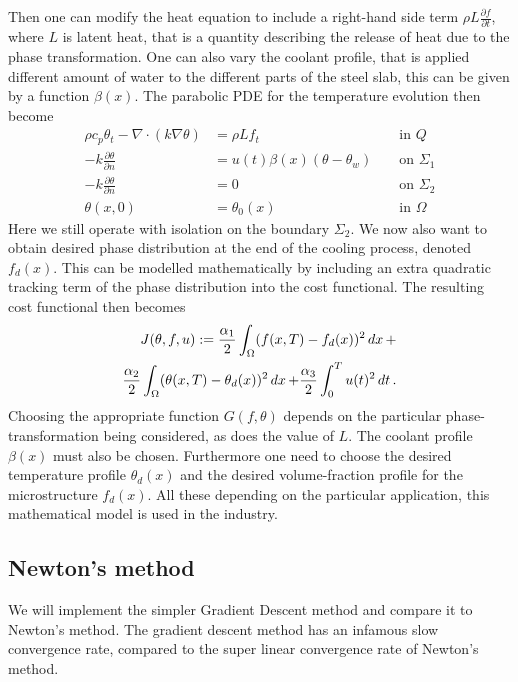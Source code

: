 Then one can modify the heat equation to include a right-hand side term $\rho L \frac{\partial f}{\partial t}$, where $L$ is latent heat, that is a quantity describing the release of heat due to the phase transformation. One can also vary the coolant profile, that is applied different amount of water to the different parts of the steel slab, this can be given by a function $\beta (x)$. The parabolic PDE for the temperature evolution then become 
\begin{align*}
    \rho c_p \theta_t - \nabla \cdot (k\nabla \theta) &= \rho L f_t  &&\textrm{ in } Q \\
    - k \frac{\partial \theta}{\partial n} &= u(t)\beta(x) \left(\theta - \theta_w \right) &&\textrm{ on }\Sigma_1 \\
    -k \frac{\partial \theta}{\partial n} &= 0 &&\textrm{ on } \Sigma_2 \\
    \theta(x,0) &= \theta_0(x) &&\textrm{ in } \Omega
\end{align*}
Here we still operate with isolation on the boundary $\Sigma_2$. We now also want to obtain desired phase distribution at the end of the cooling process, denoted $f_d(x)$. This can be modelled mathematically by including an extra quadratic tracking term of the phase distribution into the cost functional. The resulting cost functional then becomes
\begin{equation*}
\begin{aligned}
        J(\theta, f, u) := \frac{\alpha_1}{2}\int_{\Omega}(f(x,T)-f_d(x))^2\mathop{dx} + \\ \frac{\alpha_2}{2}\int_{\Omega}(\theta(x,T) - \theta_d(x))^2\mathop{dx}  + \frac{\alpha_3}{2}\int_0^Tu(t)^2 \mathop{dt}.
\end{aligned}
\end{equation*}
Choosing the appropriate function $G(f,\theta)$ depends on the particular phase-transformation being considered, as does the value of $L$. The coolant profile $\beta(x)$ must also be chosen. Furthermore one need to choose the desired temperature profile $\theta_d(x)$ and the desired volume-fraction profile for the microstructure $f_d(x)$. All these depending on the particular application, this mathematical model is used in the industry. 

\subsection{Newton's method}
 We will implement the simpler Gradient Descent method and compare it to Newton's method. The gradient descent method has an infamous slow convergence rate, compared to the super linear convergence rate of Newton's method.